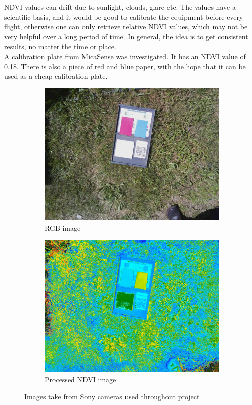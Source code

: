 NDVI values can drift due to sunlight, clouds, glare etc. The values have a scientific basis, and it would be good to calibrate the equipment before every flight, otherwise one can only retrieve relative NDVI values, which may not be very helpful over a long period of time. In general, the idea is to get consistent results, no matter the time or place.\\

A calibration plate from MicaSense was investigated. It has an NDVI value of 0.18. There is also a piece of red and blue paper, with the hope that it can be used as a cheap calibration plate.

\begin{figure}[H]
\begin{subfigure}{0.5\textwidth}
\centering
\includegraphics[scale=0.15]{images/rgb_cal.jpg}
\caption{RGB image}
\end{subfigure}
\begin{subfigure}{0.5\textwidth}
\centering
\includegraphics[scale=0.15]{images/ndvi_cal.jpg}
\caption{Processed NDVI image}
\end{subfigure}
\caption{Images take from Sony cameras used throughout project}
\label{fig:cal_plate}
\end{figure}

